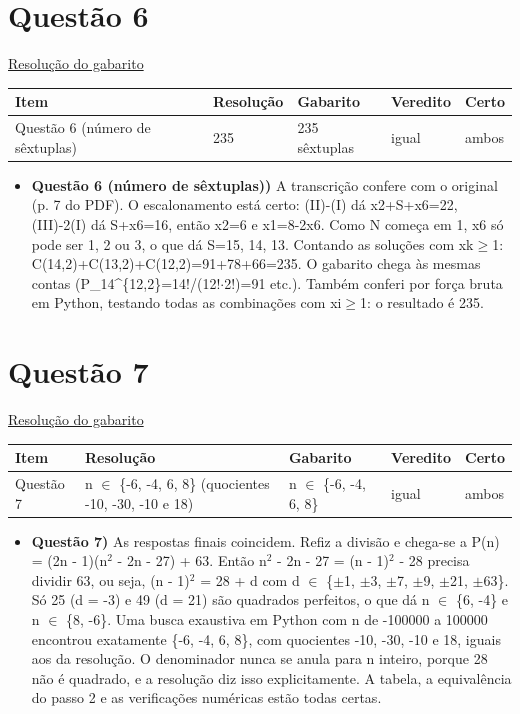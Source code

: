 \documentclass{article}%
\begin{document}
\section*{Questão 6}%
\href{https://poliedroresolve.sistemapoliedro.com.br/vestibulares/ita/2027/ita-2-fase-dia-1-20-10-2026-2-fase-dia-1/dissertativa-6-matematica-2-fase-dia-1-ita-2027}{Resolução do gabarito}\par\smallskip%
\begin{longtable}{@{}p{} p{} p{} p{} p{}@{}}\toprule Item & Resolução & Gabarito & Veredito & Certo \\ \midrule
Questão 6 (número de sêxtuplas) & 235 & 235 sêxtuplas & igual & ambos \\
\bottomrule\end{longtable}%
\begin{itemize}%
\item%
\textbf{Questão 6 (número de sêxtuplas))} A transcrição confere com o original (p. 7 do PDF). O escalonamento está certo: (II)-(I) dá x2+S+x6=22, (III)-2(I) dá S+x6=16, então x2=6 e x1=8-2x6. Como N começa em 1, x6 só pode ser 1, 2 ou 3, o que dá S=15, 14, 13. Contando as soluções com xk$\geq$1: C(14,2)+C(13,2)+C(12,2)=91+78+66=235. O gabarito chega às mesmas contas (P\_14\^{}\{12,2\}=14!/(12!$\cdot$2!)=91 etc.). Também conferi por força bruta em Python, testando todas as combinações com xi$\geq$1: o resultado é 235.%
\end{itemize}%
\section*{Questão 7}%
\href{https://poliedroresolve.sistemapoliedro.com.br/vestibulares/ita/2027/ita-2-fase-dia-1-20-10-2026-2-fase-dia-1/dissertativa-7-matematica-2-fase-dia-1-ita-2027}{Resolução do gabarito}\par\smallskip%
\begin{longtable}{@{}p{} p{} p{} p{} p{}@{}}\toprule Item & Resolução & Gabarito & Veredito & Certo \\ \midrule
Questão 7 & n $\in$ \{-6, -4, 6, 8\} (quocientes -10, -30, -10 e 18) & n $\in$ \{-6, -4, 6, 8\} & igual & ambos \\
\bottomrule\end{longtable}%
\begin{itemize}%
\item%
\textbf{Questão 7)} As respostas finais coincidem. Refiz a divisão e chega{-}se a P(n) = (2n - 1)(n$^2$ - 2n - 27) + 63. Então n$^2$ - 2n - 27 = (n - 1)$^2$ - 28 precisa dividir 63, ou seja, (n - 1)$^2$ = 28 + d com d $\in$ \{$\pm$1, $\pm$3, $\pm$7, $\pm$9, $\pm$21, $\pm$63\}. Só 25 (d = -3) e 49 (d = 21) são quadrados perfeitos, o que dá n $\in$ \{6, -4\} e n $\in$ \{8, -6\}. Uma busca exaustiva em Python com n de -100000 a 100000 encontrou exatamente \{-6, -4, 6, 8\}, com quocientes -10, -30, -10 e 18, iguais aos da resolução. O denominador nunca se anula para n inteiro, porque 28 não é quadrado, e a resolução diz isso explicitamente. A tabela, a equivalência do passo 2 e as verificações numéricas estão todas certas.%
\end{itemize}%
\end{document}
